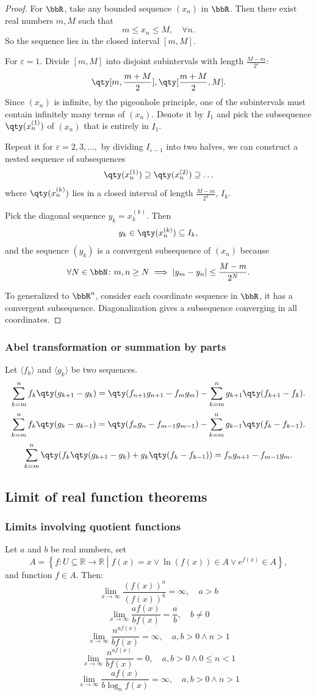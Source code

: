 \begin{proof}
    For $\bbR$, take any bounded sequence $(x_n)$ in $\bbR$. Then there exist real numbers $m,M$ such that
    \[m\leq x_n\leq M,\quad\forall n.\]
    So the sequence lies in the closed interval $[m,M]$.

    For $\varepsilon=1$. Divide $[m,M]$ into disjoint subintervals with length $\frac{M-m}{2^\varepsilon}$:
    \[\qty[m,\frac{m+M}{2}],\qty[\frac{m+M}{2},M].\]
    Since $(x_n)$ is infinite, by the pigeonhole principle, one of the subintervals must contain infinitely many terms of $(x_n)$. Denote it by $I_1$ and pick the subsequence $\qty(x_n^{(1)})$ of $(x_n)$ that is entirely in $I_1$.

    Repeat it for $\varepsilon=2,3,\ldots,$ by dividing $I_{\varepsilon-1}$ into two halves, we can construct a nested sequence of subsequences
    \[\qty(x_n^{(1)})\supseteq \qty(x_n^{(2)})\supseteq\ldots\]
    where $\qty(x_n^{(k)})$ lies in a closed interval of length $\frac{M-m}{2^k}$, $I_k$.

    Pick the diagonal sequence $y_k=x_k^{(k)}$. Then
    \[y_k\in\qty(x_n^{(k)})\subseteq I_k,\]
    and the sequence $(y_k)$ is a convergent subsequence of $(x_n)$ because
    \[\forall N\in\bbN\colon m,n\geq N\implies |y_m-y_n|\leq\frac{M-m}{2^N}.\]

    To generalized to $\bbR^n$, consider each coordinate sequence in $\bbR$, it has a convergent subsequence. Diagonalization gives a subsequence converging in all coordinates.
\end{proof}
\subsubsection{Abel transformation or summation by parts}
Let $\langle f_k\rangle$ and $\langle g_k\rangle$ be two sequences.
\[\sum_{k=m}^nf_k\qty(g_{k+1}-g_k)=\qty(f_{n+1}g_{n+1}-f_mg_m)-\sum_{k=m}^ng_{k+1}\qty(f_{k+1}-f_k).\]
\[\sum_{k=m}^nf_k\qty(g_k-g_{k-1})=\qty(f_ng_n-f_{m-1}g_{m-1})-\sum_{k=m}^ng_{k-1}\qty(f_k-f_{k-1}).\]
\[\sum_{k=m}^n\qty(f_k\qty(g_{k+1}-g_k)+g_k\qty(f_k-f_{k-1}))=f_ng_{n+1}-f_{m-1}g_m.\]
\subsection{Limit of real function theorems}
\subsubsection{Limits involving quotient functions}
Let \( a \) and \( b \) be real numbers, set
\[A=\left\{f\colon U\subseteq\mathbb{R}\to\mathbb{R} \middle | f(x) = x \lor \ln(f(x)) \in A \lor e^{f\left(x\right)}  \in A \right\},\]
and function $f\in A$. Then:
\[\lim_{x \to \infty} \frac{\left(f\left(x\right)\right)^a}{\left(f\left(x\right)\right)^b} = \infty, \quad a > b \]
\[ \lim_{x \to \infty} \frac{af\left(x\right)}{bf\left(x\right)} = \frac{a}{b}, \quad b \neq 0 \]
\[ \lim_{x \to \infty}\frac{n^{af\left(x\right)}}{bf\left(x\right)} = \infty, \quad a,b > 0 \land  n > 1 \]
\[ \lim_{x \to \infty}\frac{n^{af\left(x\right)}}{bf\left(x\right)} = 0, \quad a,b > 0 \land  0\leq n<1 \]
\[ \lim_{x \to \infty}\frac{af\left(x\right)}{b\log_n f\left(x\right)} = \infty, \quad a,b > 0 \land  n > 1 \]
